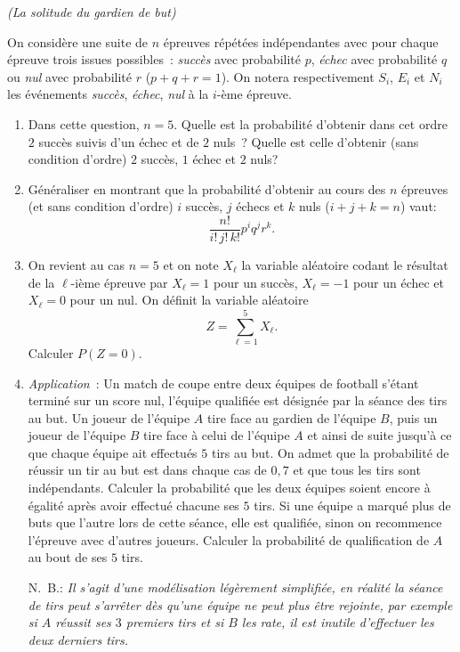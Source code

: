 \documentclass[a4paper,12pt,reqno]{amsart}
\begin{document}
\begin{exo} \emph{(La solitude du gardien de but)}

  On considère une suite de $n$ épreuves répétées indépendantes avec pour chaque épreuve trois issues possibles~: \emph{succès} avec probabilité $p$, \emph{échec} avec probabilité $q$ ou \emph{nul} avec probabilité $r$ ($p+q+r=1$). On notera respectivement $S_i$, $E_i$ et $N_i$ les événements \emph{succès}, \emph{échec}, \emph{nul} à la $i$-ème épreuve.

  \begin{enumerate}
    \item Dans cette question, $n=5$. Quelle est la probabilité d'obtenir dans cet ordre $2$ succès suivis d'un échec et de $2$ nuls~? Quelle est celle d'obtenir (sans condition d'ordre) $2$ succès, $1$ échec et $2$ nuls?
    \item Généraliser en montrant que la probabilité d'obtenir au cours des $n$ épreuves (et sans condition d'ordre) $i$ succès, $j$ échecs et $k$ nuls ($i+j+k=n$) vaut:
    $$
      \frac{n!}{i!\,j!\,k!}p^iq^jr^k.
    $$
    \item On revient au cas $n=5$ et on note $X_\ell$ la variable aléatoire codant le résultat de la $\ell$-ième épreuve par $X_\ell=1$ pour un succès, $X_\ell=-1$ pour un échec et $X_\ell=0$ pour un nul. On définit la variable aléatoire
    $$
      Z=\sum_{\ell=1}^5 X_{\ell}.
    $$
    Calculer $P(Z=0)$.
    \item \emph{Application}~: Un match de coupe entre deux équipes de football s'étant terminé sur un score nul, l'équipe qualifiée est désignée par la séance des tirs au but. Un joueur de l'équipe $A$ tire face au gardien de l'équipe $B$, puis un joueur de l'équipe $B$ tire face à celui de l'équipe $A$ et ainsi de suite jusqu'à ce que chaque équipe ait effectués $5$ tirs au but. On admet que la probabilité de réussir un tir au but est dans chaque cas de $0,7$ et que tous les tirs sont indépendants. Calculer la probabilité que les deux équipes soient encore à égalité après avoir effectué chacune ses $5$ tirs. Si une équipe a marqué plus de buts que l'autre lors de cette séance, elle est qualifiée, sinon on recommence l'épreuve avec d'autres joueurs. Calculer la probabilité de qualification de $A$ au bout de ses $5$ tirs.

    N.~B.: \emph{Il s'agit d'une modélisation légèrement simplifiée, en réalité la séance de tirs peut s'arrêter dès qu'une équipe ne peut plus être rejointe, par exemple si $A$ réussit ses $3$ premiers tirs et si $B$ les rate, il est inutile d'effectuer les deux derniers tirs.}
  \end{enumerate}

\end{exo}
\end{document}
